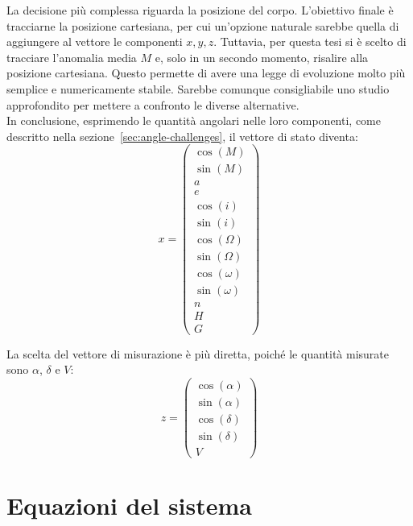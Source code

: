 \documentclass[12pt,a4paper,openright,twoside]{book}
\begin{document}
La decisione più complessa riguarda la posizione del corpo. L'obiettivo finale è tracciarne la posizione cartesiana, per cui un'opzione naturale sarebbe quella di aggiungere al vettore le componenti $x,y,z$. Tuttavia, per questa tesi si è scelto di tracciare l'anomalia media $M$ e, solo in un secondo momento, risalire alla posizione cartesiana. Questo permette di avere una legge di evoluzione molto più semplice e numericamente stabile. Sarebbe comunque consigliabile uno studio approfondito per mettere a confronto le diverse alternative. \\

In conclusione, esprimendo le quantità angolari nelle loro componenti, come descritto nella sezione~\ref{sec:angle-challenges}, il vettore di stato diventa:
\begin{equation}
x=\left(\begin{smallmatrix}
\cos(M) \\
\sin(M) \\
a \\
e \\
\cos(i) \\
\sin(i) \\
\cos(\Omega) \\
\sin(\Omega) \\
\cos(\omega) \\
\sin(\omega) \\
n \\
H \\
G
\end{smallmatrix}\right)
\end{equation} \pagebreak

La scelta del vettore di misurazione è più diretta, poiché le quantità misurate sono $\alpha$, $\delta$ e $V$:
\begin{equation}
z=\left(\begin{smallmatrix}
\cos(\alpha) \\
\sin(\alpha) \\
\cos(\delta) \\
\sin(\delta) \\
V
\end{smallmatrix}\right)
\end{equation}

\section{Equazioni del sistema}\label{sec:real-system-eqs}
\end{document}
